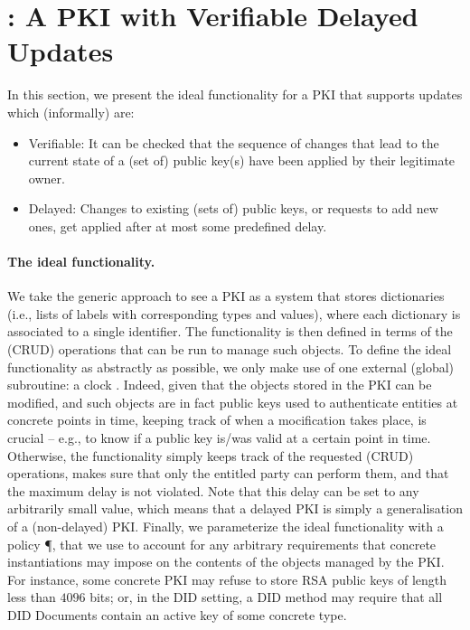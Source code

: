 \section{\IdealGPKIDID: A PKI with Verifiable Delayed Updates}
\label{sec:pkivdu}

In this section, we present the ideal functionality for a PKI that supports
updates which (informally) are:

\begin{itemize}
\item Verifiable: It can be checked that the sequence of changes that lead to
  the current state of a (set of) public key(s) have been applied by their
  legitimate owner.
\item Delayed: Changes to existing (sets of) public keys, or requests to add
  new ones, get applied after at most some predefined delay.
\end{itemize}

\paragraph{The ideal functionality.} %
We take the generic approach to see a PKI as a system that stores dictionaries
(i.e., lists of labels with corresponding types and values), where each
dictionary is associated to a single identifier. The functionality is then
defined in terms of the (CRUD) operations that can be run to manage such
objects. To define the ideal functionality as abstractly as possible, we only
make use of one external (global) subroutine: a clock \IdealGclock.
Indeed, given that the objects stored in the PKI can be modified, and such
objects are in fact public keys used to authenticate entities at concrete points
in time, keeping track of when a mocification takes place, is crucial -- e.g.,
to know if a public key is/was valid at a certain point in time.
%
Otherwise, the functionality simply keeps track of the requested (CRUD)
operations, makes sure that only the entitled party can perform them, and that
the maximum delay is not violated. Note that this delay can be set to any
arbitrarily small value, which means that a delayed PKI is simply a
generalisation of a (non-delayed) PKI.
%
Finally, we parameterize the ideal functionality with a policy \P, that we use
to account for any arbitrary requirements that concrete instantiations may
impose on the contents of the objects managed by the PKI. For instance, some
concrete PKI may refuse to store RSA public keys of length less than $4096$
bits; or, in the DID setting, a DID method may require that all DID Documents
contain an active key of some concrete type. 

